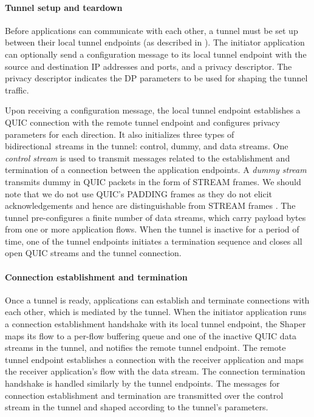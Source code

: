 \paragraph{Tunnel setup and teardown}
Before applications can communicate with each other, a {\sys} tunnel must be set up between their local tunnel endpoints (as described in ).
The initiator application can optionally send a configuration message to its local tunnel endpoint with the source and destination IP addresses and ports, and a privacy descriptor.
The privacy descriptor indicates the DP parameters to be used for shaping the tunnel traffic.

Upon receiving a configuration message, the local tunnel endpoint establishes a QUIC connection with the remote tunnel endpoint and configures privacy parameters for each direction.
It also initializes three types of bidirectional~streams in the tunnel: control, dummy, and data streams.
One {\em control stream} is used to transmit messages related to the establishment and termination of a connection between the application endpoints. 
A {\em dummy stream} transmits dummy in QUIC packets in the form of STREAM frames.
We should note that we do not use QUIC's PADDING frames as they do not elicit acknowledgements and hence are distinguishable from STREAM frames \cite{rfc9000}.
The tunnel pre-configures a finite number of data streams, which carry payload bytes from one or more application flows.
When the tunnel is inactive for a period of time, one of the tunnel endpoints initiates a termination sequence and closes all open QUIC streams and the tunnel connection.

\paragraph{Connection establishment and termination}
Once a tunnel is ready, applications can establish and terminate connections with each other, which is mediated by the tunnel.
When the initiator application runs a connection establishment handshake with its local tunnel endpoint, the Shaper maps its flow to a per-flow buffering queue and one of the inactive QUIC data streams in the tunnel, and notifies the remote tunnel endpoint.
The remote tunnel endpoint establishes a connection with the receiver application and maps the receiver application's flow with the data stream.
The connection termination handshake is handled similarly by the tunnel endpoints.
The messages for connection establishment and termination are transmitted over the control stream in the tunnel and shaped according to the tunnel's parameters.

